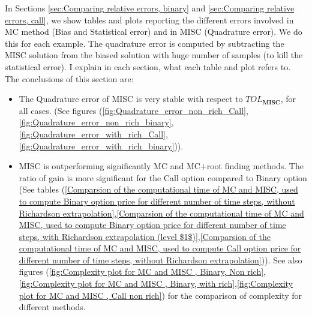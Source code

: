 \documentclass[11pt]{article}
\begin{document}
In Sections \ref{sec:Comparing relative errors, binary} and \ref{sec:Comparing relative errors, call}, we show tables and plots reporting  the different errors involved in MC method (Bias and Statistical error) and in MISC (Quadrature error). We do this for each example. The quadrature error is computed by subtracting the MISC solution from the biased solution with huge number of samples (to kill the statistical error). I explain in each section, what each table and plot  refers to. The conclusions of this section are: 
\begin{itemize}
	\item The Quadrature error of MISC is very stable with respect to $TOL_{\textbf{MISC}}$, for all cases. (See figures (\ref{fig:Quadrature_error_non_rich_Call},\ref{fig:Quadrature_error_non_rich_binary},\ref{fig:Quadrature_error_with_rich_Call},\ref{fig:Quadrature_error_with_rich_binary})).
	
	\item MISC is outperforming significantly MC and MC+root finding methods. The ratio of gain is more significant for the Call option compared to Binary option (See tables (\ref{Comparsion of the computational time of  MC and MISC, used to compute Binary option price  for different number of time steps, without Richardson extrapolation},\ref{Comparsion of the computational time of  MC and MISC, used to compute Binary option price  for different number of time steps, with Richardson extrapolation (level $1$)},\ref{Comparsion of the computational time of  MC and MISC, used to compute Call option price  for different number of time steps, without Richardson extrapolation})). See also figures (\ref{fig:Complexity plot for MC and MISC , Binary, Non rich},\ref{fig:Complexity plot for MC and MISC , Binary, with rich},\ref{fig:Complexity plot for MC and MISC , Call non rich}) for the comparison of complexity for different methods.
	

\end{itemize}
\end{document}
